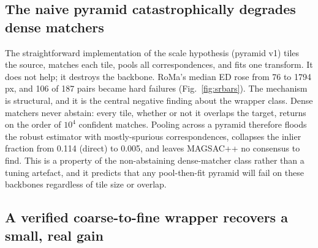 \documentclass[fleqn,10pt]{wlscirep}
\begin{document}
\subsection*{The naive pyramid catastrophically degrades dense matchers}

The straightforward implementation of the scale hypothesis (pyramid v1) tiles the source, matches each tile, pools all correspondences, and fits one transform. It does not help; it destroys the backbone. RoMa's median ED rose from 76 to 1794\,px, and 106 of 187 pairs became hard failures (Fig.~\ref{fig:srbars}). The mechanism is structural, and it is the central negative finding about the wrapper class. Dense matchers never abstain: every tile, whether or not it overlaps the target, returns on the order of $10^4$ confident matches. Pooling across a pyramid therefore floods the robust estimator with mostly-spurious correspondences, collapses the inlier fraction from 0.114 (direct) to 0.005, and leaves MAGSAC++ no consensus to find. This is a property of the non-abstaining dense-matcher class rather than a tuning artefact, and it predicts that any pool-then-fit pyramid will fail on these backbones regardless of tile size or overlap.

\subsection*{A verified coarse-to-fine wrapper recovers a small, real gain}
\end{document}
